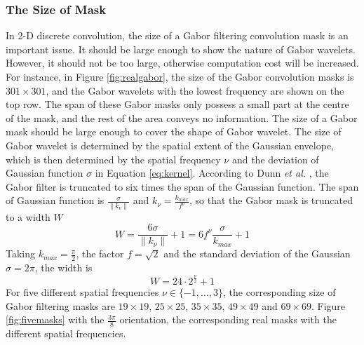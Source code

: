 \subsubsection{The Size of Mask}
In 2-D discrete convolution, the size of a Gabor filtering convolution mask is an important issue. It should be large enough to show the nature of Gabor wavelets. However, it should not be too large, otherwise computation cost will be increased. For instance, in \mbox{Figure} \ref{fig:realgabor}, the size of the Gabor convolution masks is $301\times301$, and the Gabor wavelets with the lowest frequency are shown on the top row. The span of these Gabor masks only possess a small part at the centre of the mask, and the rest of the area conveys no information. The size of a Gabor mask should be large enough to cover the shape of Gabor wavelet. The size of Gabor wavelet is determined by the spatial extent of the Gaussian envelope, which is then determined by the spatial frequency $\nu$ and the deviation of Gaussian function $\sigma$ in \mbox{Equation} \ref{eq:kernel}. According to Dunn \textit{et al.} \cite{Dunn1995}, the Gabor filter is truncated to six times the span of the Gaussian function. The span of Gaussian function is $\frac{\sigma}{\|k_{\nu}\|}$ and $k_{\nu}=\frac{k_{max}}{f^{\nu}}$, so that the Gabor mask is truncated to a width $W$
 \begin{equation}
  W  = \frac{6\sigma}{\|k_{\nu}\|}+1 = 6 f^{\nu}\frac{\sigma}{k_{max}}+1
 \end{equation}
Taking $k_{max}=\frac{\pi}{2}$, the factor $f = \sqrt{2}$ and the standard deviation of the Gaussian $\sigma=2\pi$, the width is 
\begin{equation}
 W = 24\cdot2^{\frac{\nu}{2}}+1
\end{equation}
For five different spatial frequencies $\nu\in\{-1,\ldots,3\}$, the corresponding size of Gabor filtering masks are $19\times19$, $25\times25$, $35\times35$, $49\times49$ and $69\times69$. \mbox{Figure} \ref{fig:fivemasks} with the $\frac{3\pi}{8}$ orientation, the corresponding real masks with the different spatial frequencies.
